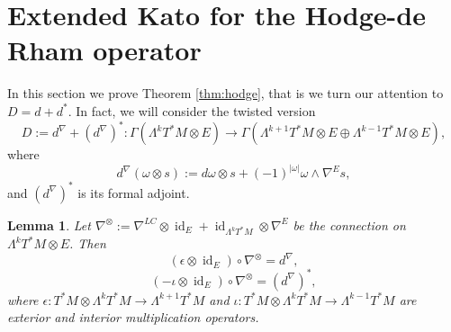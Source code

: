 \documentclass[12pt]{amsart} %
\newtheorem{lemma}[theorem]{Lemma}
\theoremstyle{definition}
\numberwithin{equation}{section}
\DeclareMathOperator{\id}{id}
\newcommand{\ra}{\rightarrow}
\begin{document}
\section{Extended Kato for the Hodge-de Rham operator} \label{sect4}

In this section we prove Theorem \ref{thm:hodge}, that is we turn our attention to $D=d+d^ *$. In fact, we will consider  the twisted version
 \[D:=d^{\nabla}+(d^ {\nabla})^ *:\Gamma(\Lambda^kT^ *M\otimes E)\ra \Gamma(\Lambda^ {k+1}T^ *M\otimes E\oplus \Lambda^ {k-1}T^ *M\otimes E) , \]
where 
\[d^{\nabla}(\omega\otimes s):=d\omega\otimes s+(-1)^{|\omega|} \omega\wedge \nabla^E s , \]
and $(d^{\nabla})^*$ is its formal adjoint.
 \begin{lemma}\label{nL} Let $\nabla^ {\otimes}:=\nabla^{LC}\otimes \id_E+\id_{\Lambda^kT^*M}\otimes \nabla^E$ be the connection on $\Lambda^kT^ *M\otimes E$. Then
\begin{equation}\label{eq001} (\epsilon\otimes \id_E)\circ \nabla^ {\otimes}=d^{\nabla} , \end{equation}
\begin{equation}\label{eq002} (-\iota\otimes \id_E)\circ \nabla^ {\otimes}=(d^{\nabla})^*,\end{equation}
where $\epsilon:T^*M\otimes \Lambda^kT^ *M\ra \Lambda^{k+1}T^ *M$ and $\iota:T^*M\otimes \Lambda^kT^ *M\ra\Lambda^{k-1}T^ *M$ are exterior and interior multiplication operators.
\end{lemma}
\end{document}

